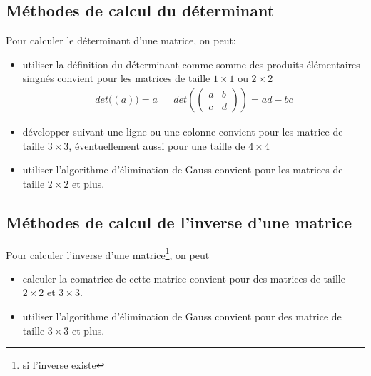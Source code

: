 \subsection{Méthodes de calcul du déterminant}
%
Pour calculer le déterminant d'une matrice, on peut:
\begin{itemize}
  \item utiliser la définition du déterminant comme somme des produits élémentaires singnés convient pour les matrices de taille $1 \times 1$ ou $2 \times 2$
    $$\begin{array}{lcr} det\big((a)\big) = a & & det\left(\begin{pmatrix} a & b \\ c & d \end{pmatrix}\right) = ad - bc \end{array}$$
  \item développer suivant une ligne ou une colonne convient pour les matrice de taille $3 \times 3$, éventuellement aussi pour une taille de $4 \times 4$
  \item utiliser l'algorithme d'élimination de Gauss convient pour les matrices de taille $2 \times 2$ et plus.
\end{itemize}

%
\subsection{Méthodes de calcul de l'inverse d'une matrice}
Pour calculer  l'inverse d'une matrice\footnote{si l'inverse existe}, on peut
\begin{itemize}
  \item calculer la comatrice de cette matrice convient pour des matrices de taille $2 \times 2$ et $3 \times 3$.
  \item utiliser l'algorithme d'élimination de Gauss convient pour des matrice de taille $3 \times 3$ et plus.
\end{itemize}
